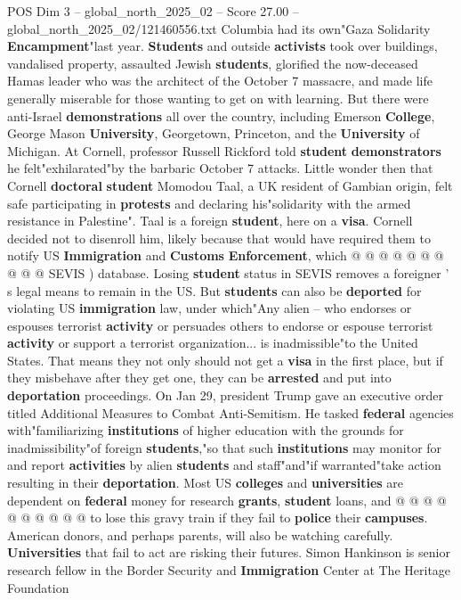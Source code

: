 \begin{textsample}{POS Dim 3 – global\_north\_2025\_02 – Score 27.00 – global\_north\_2025\_02/121460556.txt}
Columbia had its own"Gaza Solidarity \textbf{Encampment}"last year. \textbf{Students} and outside \textbf{activists} took over buildings, vandalised property, assaulted Jewish \textbf{students}, glorified the now-deceased Hamas leader who was the architect of the October 7 massacre, and made life generally miserable for those wanting to get on with learning.
But there were anti-Israel \textbf{demonstrations} all over the country, including Emerson \textbf{College}, George Mason \textbf{University}, Georgetown, Princeton, and the \textbf{University} of Michigan.
At Cornell, professor Russell Rickford told \textbf{student} \textbf{demonstrators} he felt"exhilarated"by the barbaric October 7 attacks.
Little wonder then that Cornell \textbf{doctoral} \textbf{student} Momodou Taal, a UK resident of Gambian origin, felt safe participating in \textbf{protests} and declaring his"solidarity with the armed resistance in Palestine".
Taal is a foreign \textbf{student}, here on a \textbf{visa}.
Cornell decided not to disenroll him, likely because that would have required them to notify US \textbf{Immigration} and \textbf{Customs} \textbf{Enforcement}, which @ @ @ @ @ @ @ @ @ @ SEVIS ) database.
Losing \textbf{student} status in SEVIS removes a foreigner ' s legal means to remain in the US.
But \textbf{students} can also be \textbf{deported} for violating US \textbf{immigration} law, under which"Any alien -- who endorses or espouses terrorist \textbf{activity} or persuades others to endorse or espouse terrorist \textbf{activity} or support a terrorist organization... is inadmissible"to the United States.
That means they not only should not get a \textbf{visa} in the first place, but if they misbehave after they get one, they can be \textbf{arrested} and put into \textbf{deportation} proceedings.
On Jan 29, president Trump gave an executive order titled Additional Measures to Combat Anti-Semitism.
He tasked \textbf{federal} agencies with"familiarizing \textbf{institutions} of higher education with the grounds for inadmissibility"of foreign \textbf{students},"so that such \textbf{institutions} may monitor for and report \textbf{activities} by alien \textbf{students} and staff"and"if warranted"take action resulting in their \textbf{deportation}.
Most US \textbf{colleges} and \textbf{universities} are dependent on \textbf{federal} money for research \textbf{grants}, \textbf{student} loans, and @ @ @ @ @ @ @ @ @ @ to lose this gravy train if they fail to \textbf{police} their \textbf{campuses}.
American donors, and perhaps parents, will also be watching carefully. \textbf{Universities} that fail to act are risking their futures.
Simon Hankinson is senior research fellow in the Border Security and \textbf{Immigration} Center at The Heritage Foundation

\end{textsample}
